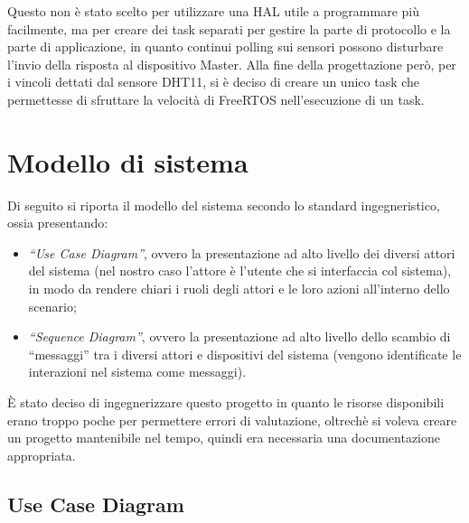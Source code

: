 \documentclass[a4paper,titlepage]{book}
\newcommand{\itema}{\begin{itemize}[noitemsep,topsep=10pt,parsep=5pt,partopsep=10pt]}
\begin{document}
Questo non è stato scelto per utilizzare una HAL utile a programmare più facilmente, ma per creare dei task separati per gestire la parte di protocollo e la parte di applicazione, in quanto continui polling sui sensori possono disturbare l'invio della risposta al dispositivo Master. Alla fine della progettazione però, per i vincoli dettati dal sensore DHT11, si è deciso di creare un unico task che permettesse di sfruttare la velocità di FreeRTOS nell'esecuzione di un task.




\chapter{Modello di sistema}

Di seguito si riporta il modello del sistema secondo lo standard ingegneristico, ossia presentando:

\itema 

\item\textit{``Use Case Diagram''}, ovvero la presentazione ad alto livello dei diversi attori del sistema (nel nostro caso l'attore è l'utente che si interfaccia col sistema), in modo da rendere chiari i ruoli degli attori e le loro azioni all'interno dello scenario;
\item\textit{``Sequence Diagram''}, ovvero la presentazione ad alto livello dello scambio di ``messaggi'' tra i diversi attori e dispositivi del sistema (vengono identificate le interazioni nel sistema come messaggi).

\end{itemize}

È stato deciso di ingegnerizzare questo progetto in quanto le risorse disponibili erano troppo poche per permettere errori di valutazione, oltrechè si voleva creare un progetto mantenibile nel tempo, quindi era necessaria una documentazione appropriata.

\section{Use Case Diagram}
\end{document}
